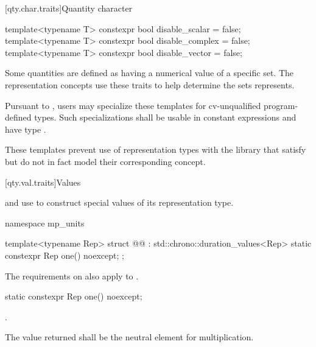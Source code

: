 [qty.char.traits]{Quantity character}

\begin{itemdecl}
template<typename T>
constexpr bool disable_scalar = false;
template<typename T>
constexpr bool disable_complex = false;
template<typename T>
constexpr bool disable_vector = false;
\end{itemdecl}

\begin{itemdescr}
\pnum
Some quantities are defined as having a numerical value of a specific set.
The representation concepts use these traits
to help determine the sets  represents.

\pnum
\remarks
Pursuant to ,
users may specialize these templates
for cv-unqualified program-defined types.
Such specializations shall be usable in constant expressions
and have type .

\pnum
\begin{note}
These templates prevent use of representation types with the library
that satisfy but do not in fact model their corresponding concept.
\end{note}
\end{itemdescr}

[qty.val.traits]{Values}

\pnum
{} and  use 
to construct special values of its representation type.

\begin{codeblock}
namespace mp_units {

template<typename Rep>
struct @@ : std::chrono::duration_values<Rep> {
  static constexpr Rep one() noexcept;
};

}
\end{codeblock}

\pnum
The requirements on 
also apply to .

\begin{itemdecl}
static constexpr Rep one() noexcept;
\end{itemdecl}

\begin{itemdescr}
\pnum
\returns
{}.

\pnum
\remarks
The value returned shall be the neutral element for multiplication.
\end{itemdescr}


